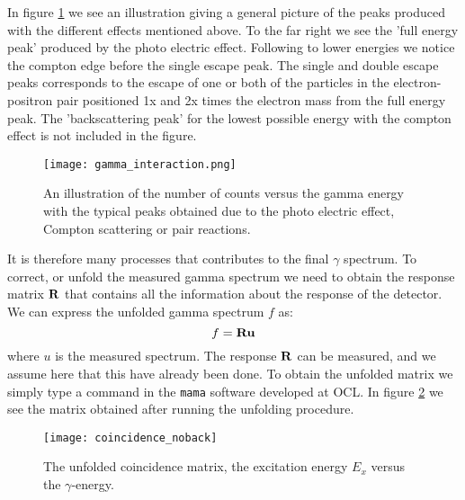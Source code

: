 \documentclass[11pt,a4wide]{article}
\begin{document}
In figure \ref{fig: gamma_interaction} we see an illustration giving a general picture of the peaks produced with the different effects mentioned above. To the far right we see the 'full energy peak' produced by the photo electric effect. Following to lower energies we notice the compton edge before the single escape peak. The single and double escape peaks corresponds to the escape of one or both of the particles in the electron-positron pair positioned 1x and 2x times the electron mass from the full energy peak. The 'backscattering peak' for the lowest possible energy with the compton effect is not included in the figure.

\begin{figure}[htp]
\centering
\texttt{[image: gamma\_interaction.png]}
\caption{An illustration of the number of counts versus the gamma energy with the typical peaks obtained due to the photo electric effect, Compton scattering or pair reactions. }
\label{fig: gamma_interaction}
\end{figure}

It is therefore many processes that contributes to the final $\gamma$ spectrum. To correct, or unfold the measured gamma spectrum we need to obtain the response matrix $\bf R$ that contains all the information about the response of the detector. We can express the unfolded gamma spectrum $f$ as:
\[
f = \bf{R} u
\]
where $u$ is the measured spectrum. The response $\bf R$ can be measured, and we assume here that this have already been done. To obtain the unfolded matrix we simply type a command in the \texttt{mama} software developed at OCL. In figure \ref{fig: un_coincidence} we see the matrix obtained after running the unfolding procedure. %

\begin{figure}[htp]
\centering
\texttt{[image: coincidence\_noback]}
\caption{The unfolded coincidence matrix, the excitation energy $E_x$ versus the $\gamma$-energy.}
\label{fig: un_coincidence}
\end{figure}

\end{document}
